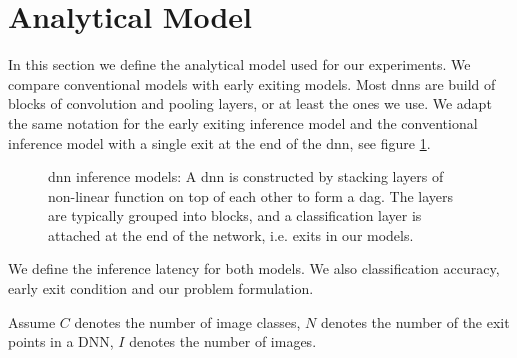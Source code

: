 \newpage\section{Analytical Model} \label{sec:ee-metrics}

In this section we define the analytical model used for our experiments. We compare conventional models with early exiting models. Most \gls{dnn}s are build of blocks of convolution and pooling layers, or at least the ones we use. We adapt the same notation for the early exiting inference model and the conventional inference model with a single exit at the end of the \gls{dnn}, see figure \ref{fig:inference_models}.
	\begin{figure}
		\centering
		\captionsetup[subfigure]{justification=centering, farskip=1pt,captionskip=1pt}
		\hfill
		\caption[\gls{dnn} structure]{\gls{dnn} inference models: A \gls{dnn} is constructed by stacking layers of non-linear function on top of each other to form a \gls{dag}. The layers are typically grouped into blocks, and a classification layer is attached at the end of the network, i.e. exits in our models.}
		\label{fig:inference_models}
	\end{figure}	
	We define the inference latency for both models. We also classification accuracy, early exit condition and our problem formulation. 
	
	Assume $ C $ denotes the number of image classes, $ N $ denotes the number of the exit points in a DNN, $ I $ denotes the number of images.


